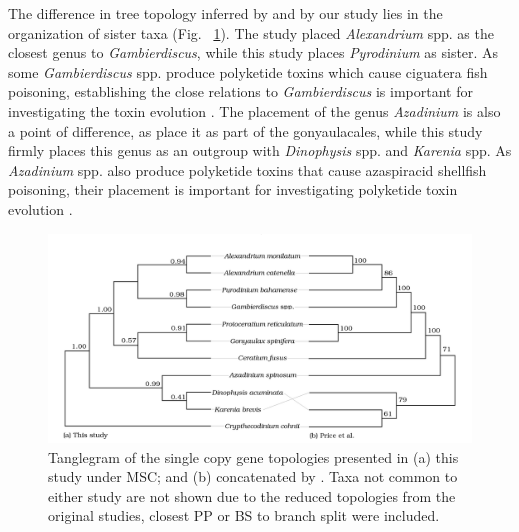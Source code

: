 \documentclass[fleqn,10pt,lineno]{wlpeerj} %
\begin{document}
The difference in tree topology inferred by \cite{price2017robust} and by our study lies in the organization of sister taxa (Fig. ~\ref{fig:tanglePrice}). 
The \cite{price2017robust} study placed \emph{Alexandrium} spp. as the closest genus to \emph{Gambierdiscus}, while this study places \emph{Pyrodinium} as sister. 
As some \emph{Gambierdiscus} spp. produce polyketide toxins which cause ciguatera fish poisoning, establishing the close relations to \emph{Gambierdiscus} is important for investigating the toxin evolution \citep{pawlowiez2014transcriptome}.
The placement of the genus \emph{Azadinium} is also a point of difference, as \cite{price2017robust} place it as part of the gonyaulacales, while this study firmly places this genus as an outgroup with \emph{Dinophysis} spp. and \emph{Karenia} spp.
As \emph{Azadinium} spp. also produce polyketide toxins that cause azaspiracid shellfish poisoning, their placement is important for investigating polyketide toxin evolution \citep{meyer2015transcriptomic}.
 
\begin{figure}[ht]
\centering
\includegraphics[width=\linewidth]{gonya-figs/Price-comparison.png}
\caption{Tanglegram of the single copy gene topologies presented in (a) this study under MSC; and (b) concatenated by \cite{price2017robust}. Taxa not common to either study are not shown due to the reduced topologies from the original studies, closest PP or BS to branch split were included.} 
\label{fig:tanglePrice}
\end{figure} 
\end{document}
